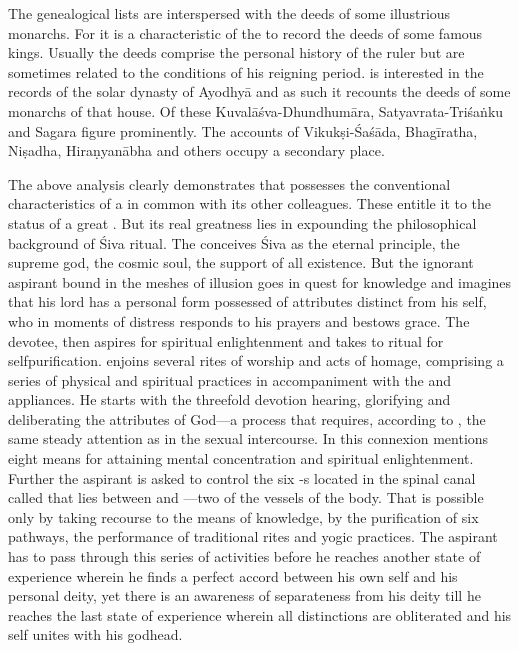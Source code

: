 The genealogical lists are interspersed with the deeds of some illustrious
monarchs. For it is a characteristic of the  to record the deeds
of some famous kings. Usually the deeds comprise the personal history of
the ruler but are sometimes related to the conditions of his reigning period.
 is interested in the records of the solar dynasty of Ayodhyā and
as such it recounts the deeds of some monarchs of that house. Of these
Kuvalāśva-Dhundhumāra, Satyavrata-Triśaṅku and Sagara figure prominently.
The accounts of Vikukṣi-Śaśāda, Bhagīratha, Niṣadha, Hiraṇyanābha and others
occupy a secondary place.

The above analysis clearly demonstrates that  possesses the
conventional characteristics of a  in common with its other
colleagues. These entitle it to the status of a great . But its real
greatness lies in expounding the philosophical background of Śiva ritual.
The  conceives Śiva as the eternal principle, the supreme god,
the cosmic soul, the support of all existence. But the ignorant aspirant bound
in the meshes of illusion goes in quest for knowledge and imagines that his lord
has a personal form possessed of attributes distinct from his self, who in
moments of distress responds to his prayers and bestows grace. The devotee,
then aspires for spiritual enlightenment and takes to ritual for
selfpurification.  enjoins several rites of worship and acts of
homage, comprising a series of physical and spiritual practices in accompaniment
with the  and  appliances. He starts with
the threefold devotion \viz hearing, glorifying and deliberating the attributes
of God—a process that requires, according to , the same steady
attention as in the sexual intercourse. In this connexion 
mentions eight means for attaining mental concentration and spiritual
enlightenment. Further the aspirant is asked to control the six -s
located in the spinal canal called  that lies between  and
—two of the vessels of the body. That is possible only by taking
recourse to the means of knowledge, by the purification of six pathways,
the performance of traditional rites and yogic practices. The aspirant has to pass
through this series of activities before he reaches another state of experience
wherein he finds a perfect accord between his own self and his personal deity,
yet there is an awareness of separateness from his deity till he reaches the last
state of experience wherein all distinctions are obliterated and his self unites
with his godhead.
